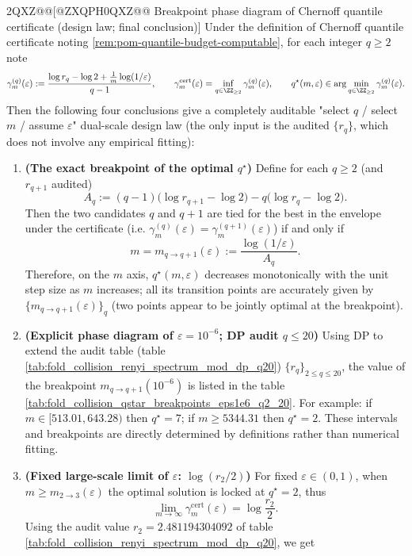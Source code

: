 \begin@@ZXQPH2QXZ@@[@ZXQPH0QXZ@@ Breakpoint phase diagram of Chernoff quantile certificate (design law; final conclusion)]\label{rem:pom-qstar-phase-diagram-breakpoints}
Under the definition of Chernoff quantile certificate noting \ref{rem:pom-quantile-budget-computable}, for each integer \(q\ge 2\) note
\[
\gamma^{(q)}_m(\varepsilon)
:=
\frac{\log r_q-\log 2+\frac{1}{m}\log(1/\varepsilon)}{q-1},
\qquad
\gamma^{\mathrm{cert}}_m(\varepsilon)=\inf_{q\in\ZZ_{\ge 2}}\gamma^{(q)}_m(\varepsilon),
\qquad
q^\star(m,\varepsilon)\in\arg\min_{q\in\ZZ_{\ge 2}}\gamma^{(q)}_m(\varepsilon).
\]
Then the following four conclusions give a completely auditable "select \(q\) / select \(m\) / assume \(\varepsilon\)" dual-scale design law (the only input is the audited \(\{r_q\}\), which does not involve any empirical fitting):
\begin{enumerate}
\item \textbf{(The exact breakpoint of the optimal \(q^\star\))}
Define for each \(q\ge 2\) (and \(r_{q+1}\) audited)
  \[
  A_q
  :=
  (q-1)\bigl(\log r_{q+1}-\log 2\bigr)-q\bigl(\log r_q-\log 2\bigr).
  \]
Then the two candidates \(q\) and \(q+1\) are tied for the best in the envelope under the certificate (i.e. \(\gamma^{(q)}_m(\varepsilon)=\gamma^{(q+1)}_m(\varepsilon)\)) if and only if
  \[
  m=m_{q\to q+1}(\varepsilon):=\frac{\log(1/\varepsilon)}{A_q}.
  \]
Therefore, on the \(m\) axis, \(q^\star(m,\varepsilon)\) decreases monotonically with the unit step size as \(m\) increases; all its transition points are accurately given by \(\{m_{q\to q+1}(\varepsilon)\}_q\) (two points appear to be jointly optimal at the breakpoint).
\item \textbf{(Explicit phase diagram of \(\varepsilon=10^{-6}\); DP audit \(q\le 20\))}
Using DP to extend the audit table (table \ref{tab:fold_collision_renyi_spectrum_mod_dp_q20}) \(\{r_q\}_{2\le q\le 20}\), the value of the breakpoint \(m_{q\to q+1}(10^{-6})\) is listed in the table \ref{tab:fold_collision_qstar_breakpoints_eps1e6_q2_20}.
For example: if \(m\in[513.01,643.28)\) then \(q^\star=7\); if \(m\ge 5344.31\) then \(q^\star=2\). These intervals and breakpoints are directly determined by definitions rather than numerical fitting.
\item \textbf{(Fixed large-scale limit of \(\varepsilon\): \texorpdfstring{$\log(r_2/2)$}{log(r2/2)})}
For fixed \(\varepsilon\in(0,1)\), when \(m\ge m_{2\to 3}(\varepsilon)\) the optimal solution is locked at \(q^\star=2\), thus
  \[
  \lim_{m\to\infty}\gamma^{\mathrm{cert}}_m(\varepsilon)=\log\frac{r_2}{2}.
  \]
Using the audit value \(r_2=2.481194304092\) of table \ref{tab:fold_collision_renyi_spectrum_mod_dp_q20}, we get

\end{enumerate}
